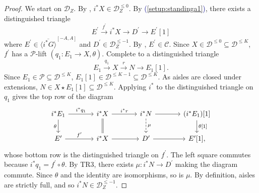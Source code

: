 \documentclass[11pt]{amsart}
\def\eqref#1{\textcolor{darkblue}{(\ref{#1})}}
\theoremstyle{plain}
\theoremstyle{definition}
\numberwithin{equation}{section}
\numberwithin{theorem}{section}
\begin{document}
\begin{proof}
    We start on $\mathcal{D}_Z$. 
    By , $i^\ast X\in \mathcal{D}_Z^{\leq 0}$.
    By \eqref{setup:standinga1}, there exists a distinguished triangle
    \begin{displaymath}
        E^\prime\xrightarrow{f^\prime} i^\ast X\to D^\prime\to E^\prime[1]
    \end{displaymath}
    where $E^\prime\in \overline{\langle i^\ast G\rangle}^{[-A,A]}$ and $D^\prime\in \mathcal{D}_Z^{\leq -1}$.
    By , $E^\prime\in \mathcal{C}$.
    Since $X\in \mathcal{D}^{\leq 0}\subseteq \mathcal{D}^{\leq K}$, $f^\prime$ has a $\mathcal{P}$-lift $(q_1\colon E_1\to X,\theta)$.
    Complete to a distinguished triangle
    \begin{displaymath}
        E_1\xrightarrow{q_1} X\xrightarrow{r} N\to E_1[1].
    \end{displaymath}
    Since $E_1\in \mathcal{P}\subseteq \mathcal{D}^{\leq K}$, $E_1[1]\in \mathcal{D}^{\leq K-1}\subseteq \mathcal{D}^{\leq K}$.
    As aisles are closed under extensions, $N\in X\star E_1[1]\subseteq \mathcal{D}^{\leq K}$.
    Applying $i^\ast$ to the distinguished triangle on $q_1$ gives the top row of the diagram
    \begin{displaymath}
        \begin{tikzcd}[column sep=large]
            i^\ast E_1 \ar[r, "i^\ast q_1"] \ar[d, "\theta"'] & i^\ast X \ar[r, "i^\ast r"] \ar[d, equal] & i^\ast N \ar[r] \ar[d, dashed, "\mu"] & (i^\ast E_1)[1] \ar[d, "{\theta[1]}"] \\
            E^\prime \ar[r, "f^\prime"] & i^\ast X \ar[r] & D^\prime \ar[r] & E^\prime[1],
        \end{tikzcd}
    \end{displaymath}
    whose bottom row is the distinguished triangle on $f^\prime$.
    The left square commutes because $i^\ast q_1 = f^\prime\circ \theta$.
    By TR3, there exists $\mu\colon i^\ast N\to D^\prime$ making the diagram commute.
    Since $\theta$ and the identity are isomorphisms, so is $\mu$.
    By definition, aisles are strictly full, and so $i^\ast N\in \mathcal{D}_Z^{\leq -1}$.


\end{proof}
\end{document}
